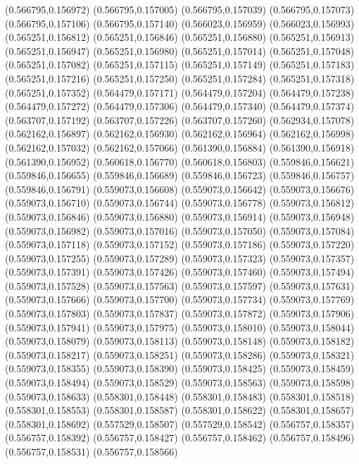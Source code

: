 (0.566795,0.156972)
(0.566795,0.157005)
(0.566795,0.157039)
(0.566795,0.157073)
(0.566795,0.157106)
(0.566795,0.157140)
(0.566023,0.156959)
(0.566023,0.156993)
(0.565251,0.156812)
(0.565251,0.156846)
(0.565251,0.156880)
(0.565251,0.156913)
(0.565251,0.156947)
(0.565251,0.156980)
(0.565251,0.157014)
(0.565251,0.157048)
(0.565251,0.157082)
(0.565251,0.157115)
(0.565251,0.157149)
(0.565251,0.157183)
(0.565251,0.157216)
(0.565251,0.157250)
(0.565251,0.157284)
(0.565251,0.157318)
(0.565251,0.157352)
(0.564479,0.157171)
(0.564479,0.157204)
(0.564479,0.157238)
(0.564479,0.157272)
(0.564479,0.157306)
(0.564479,0.157340)
(0.564479,0.157374)
(0.563707,0.157192)
(0.563707,0.157226)
(0.563707,0.157260)
(0.562934,0.157078)
(0.562162,0.156897)
(0.562162,0.156930)
(0.562162,0.156964)
(0.562162,0.156998)
(0.562162,0.157032)
(0.562162,0.157066)
(0.561390,0.156884)
(0.561390,0.156918)
(0.561390,0.156952)
(0.560618,0.156770)
(0.560618,0.156803)
(0.559846,0.156621)
(0.559846,0.156655)
(0.559846,0.156689)
(0.559846,0.156723)
(0.559846,0.156757)
(0.559846,0.156791)
(0.559073,0.156608)
(0.559073,0.156642)
(0.559073,0.156676)
(0.559073,0.156710)
(0.559073,0.156744)
(0.559073,0.156778)
(0.559073,0.156812)
(0.559073,0.156846)
(0.559073,0.156880)
(0.559073,0.156914)
(0.559073,0.156948)
(0.559073,0.156982)
(0.559073,0.157016)
(0.559073,0.157050)
(0.559073,0.157084)
(0.559073,0.157118)
(0.559073,0.157152)
(0.559073,0.157186)
(0.559073,0.157220)
(0.559073,0.157255)
(0.559073,0.157289)
(0.559073,0.157323)
(0.559073,0.157357)
(0.559073,0.157391)
(0.559073,0.157426)
(0.559073,0.157460)
(0.559073,0.157494)
(0.559073,0.157528)
(0.559073,0.157563)
(0.559073,0.157597)
(0.559073,0.157631)
(0.559073,0.157666)
(0.559073,0.157700)
(0.559073,0.157734)
(0.559073,0.157769)
(0.559073,0.157803)
(0.559073,0.157837)
(0.559073,0.157872)
(0.559073,0.157906)
(0.559073,0.157941)
(0.559073,0.157975)
(0.559073,0.158010)
(0.559073,0.158044)
(0.559073,0.158079)
(0.559073,0.158113)
(0.559073,0.158148)
(0.559073,0.158182)
(0.559073,0.158217)
(0.559073,0.158251)
(0.559073,0.158286)
(0.559073,0.158321)
(0.559073,0.158355)
(0.559073,0.158390)
(0.559073,0.158425)
(0.559073,0.158459)
(0.559073,0.158494)
(0.559073,0.158529)
(0.559073,0.158563)
(0.559073,0.158598)
(0.559073,0.158633)
(0.558301,0.158448)
(0.558301,0.158483)
(0.558301,0.158518)
(0.558301,0.158553)
(0.558301,0.158587)
(0.558301,0.158622)
(0.558301,0.158657)
(0.558301,0.158692)
(0.557529,0.158507)
(0.557529,0.158542)
(0.556757,0.158357)
(0.556757,0.158392)
(0.556757,0.158427)
(0.556757,0.158462)
(0.556757,0.158496)
(0.556757,0.158531)
(0.556757,0.158566)
